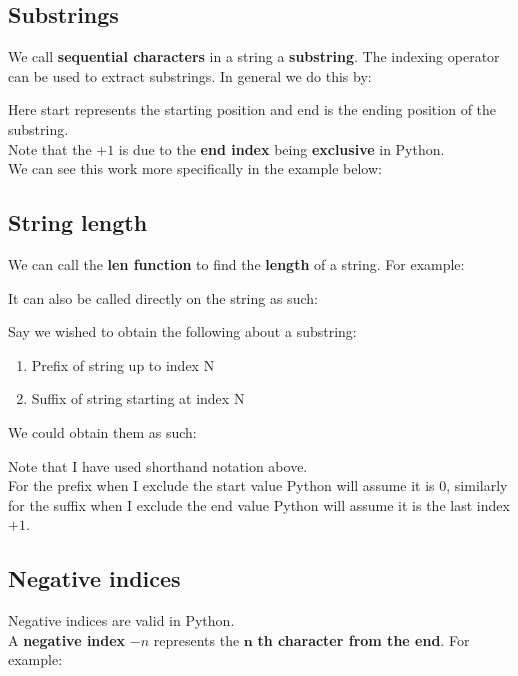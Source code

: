 \documentclass[13pt,a4paper,oneside]{book}
\begin{document}
\subsection*{Substrings}%
\label{sub:Substrings}
We call \textbf{sequential characters} in a string a \textbf{substring}. The indexing operator can be used to extract substrings. In general we do this by:

Here start represents the starting position and end is the ending position of the substring.\\
Note that the $ +1 $ is due to the \textbf{end index} being \textbf{exclusive} in Python.\\
We can see this work more specifically in the example below:

\begin{tcolorbox}[title=Output,center title,hbox]
\end{tcolorbox}
\subsection*{String length}%
\label{sub:String length}
We can call the \textbf{len function} to find the \textbf{length} of a string. For example:

\begin{tcolorbox}[title=Output,center title,hbox]
\end{tcolorbox}
It can also be called directly on the string as such:

Say we wished to obtain the following about a substring:
\begin{enumerate}
	\item Prefix of string up to index N
	\item Suffix of string starting at index N
\end{enumerate}
We could obtain them as such:
	
Note that I have used shorthand notation above.\\
For the prefix when I exclude the start value Python will assume it is 0, similarly for the suffix when I exclude the end value Python will assume it is the last index $ +1 $.
\subsection*{Negative indices}%
\label{sub:Negative indices}
Negative indices are valid in Python.\\
A \textbf{negative index} $ -n $ represents the $ \mathbf{n} $ \textbf{th character from the end}. For example:
	
	\begin{tcolorbox}[title=Output,center title,hbox]
	\end{tcolorbox}
\end{document}
